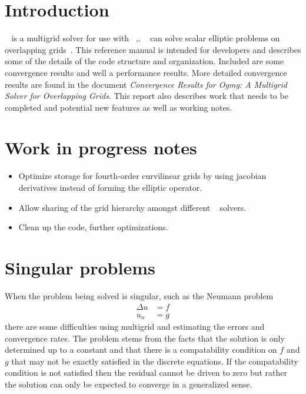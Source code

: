 \documentclass{article}
\begin{document}
\clearpage
\tableofcontents



\clearpage
\section{Introduction}

\Ogmg~ is a multigrid solver for use with \Overture~\cite{overset96},\cite{OGES}.
\Ogmg~ can solve scalar elliptic problems
on overlapping grids~\cite{automg,CGMG}. This reference manual is intended for developers and describes
some of the details of the code structure and organization.
Included are some convergence results and well a performance results. More detailed
convergence results are found in the document {\em  Convergence Results for Ogmg: A Multigrid Solver for Overlapping Grids}.
This report also describes work that needs to be completed and potential new features
as well as working notes.



\section{Work in progress notes}

\begin{itemize}
  \item Optimize storage for fourth-order curvilinear grids by using jacobian derivatives
        instead of forming the elliptic operator.
  \item Allow sharing of the grid hierarchy amongst different \Ogmg~ solvers.
  \item Clean up the code, further optimizations.
\end{itemize}




\clearpage
\section{Singular problems}

When the problem being solved is singular, such as the Neumann problem
\begin{align*}
   \Delta u & = f \\
   u_n & =g
\end{align*}
there are some difficulties using multigrid and estimating the errors and
convergence rates. The problem stems from the facts that the solution is
only determined up to a constant and that there is a compatability condition
on $f$ and $g$ that may not be exactly satisfied in the discrete equations. 
If the compatability condition is not satisfied then the residual cannot 
be driven to zero but rather the solution can only be expected to converge
in a generalized sense. 
\end{document}
